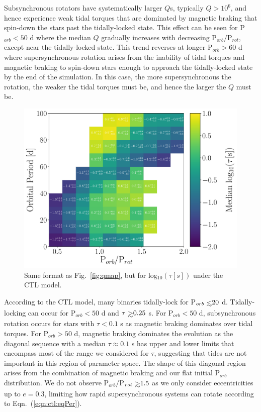 \documentclass[twocolumn]{aastex61}
\def\gsim{~\rlap{$>$}{\lower 1.0ex\hbox{$\sim$}}}
\def\lsim{~\rlap{$<$}{\lower 1.0ex\hbox{$\sim$}}}
\begin{document}
Subsynchronous rotators have systematically larger $Q$s, typically $Q > 10^6$, and hence experience weak tidal torques that are dominated by magnetic braking that spin-down the stars past the tidally-locked state.  This effect can be seen for P$_{orb} < 50$ d where the median $Q$ gradually increases with decreasing P$_{orb}/$P$_{rot}$, except near the tidally-locked state.  This trend reverses at longer P$_{orb} > 60$ d where supersynchronous rotation arises from the inability of tidal torques and magnetic braking to spin-down stars enough to approach the tidally-locked state by the end of the simulation.  In this case, the more supersynchronous the rotation, the weaker the tidal torques must be, and hence the larger the $Q$ must be. 

\begin{figure}
	\includegraphics[width=\textwidth]{../Plots/porbProtPorbTauHist.pdf}
   \caption{Same format as Fig.~\ref{fig:qmap}, but for log$_{10}(\tau [s])$ under the CTL model. }%
    \label{fig:taumap}%
\end{figure}

According to the CTL model, many binaries tidally-lock for P$_{orb} \lsim 20$ d. Tidally-locking can occur for P$_{orb} < 50$ d and $\tau \gsim 0.25$ s.  For P$_{orb} < 50$ d, subsynchronous rotation occurs for stars with $\tau < 0.1$ s as magnetic braking dominates over tidal torques.  For P$_{orb} > 50$ d, magnetic braking dominates the evolution as the diagonal sequence with a median $\tau \approx 0.1$ s has upper and lower limits that encompass most of the range we considered for $\tau$, suggesting that tides are not important in this region of parameter space.  The shape of this diagonal region arises from the combination of magnetic braking and our flat initial P$_{orb}$ distribution. We do not observe P$_{orb}/$P$_{rot} \gsim 1.5$ as we only consider eccentricities up to $e = 0.3$, limiting how rapid supersynchronous systems can rotate according to Eqn.~(\ref{eqn:ctl:eqPer}).
\end{document}
